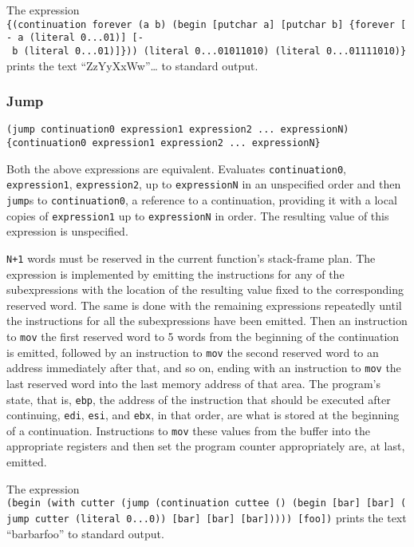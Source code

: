 \documentclass[]{article}
\begin{document}
The expression
\texttt{\{(continuation\ forever\ (a\ b)\ (begin\ {[}putchar\ a{]}\ {[}putchar\ b{]}\ \{forever\ {[}-\ a\ (literal\ 0...01){]}\ {[}-\ b\ (literal\ 0...01){]}\}))\ (literal\ 0...01011010)\ (literal\ 0...01111010)\}}
prints the text ``ZzYyXxWw''\ldots{} to standard output.

\hypertarget{jump}{\subsubsection{Jump}\label{jump}}

\begin{verbatim}
(jump continuation0 expression1 expression2 ... expressionN)
{continuation0 expression1 expression2 ... expressionN}
\end{verbatim}

Both the above expressions are equivalent. Evaluates
\texttt{continuation0}, \texttt{expression1}, \texttt{expression2}, up
to \texttt{expressionN} in an unspecified order and then \texttt{jump}s
to \texttt{continuation0}, a reference to a continuation, providing it
with a local copies of \texttt{expression1} up to \texttt{expressionN}
in order. The resulting value of this expression is unspecified.

\texttt{N+1} words must be reserved in the current function's
stack-frame plan. The expression is implemented by emitting the
instructions for any of the subexpressions with the location of the
resulting value fixed to the corresponding reserved word. The same is
done with the remaining expressions repeatedly until the instructions
for all the subexpressions have been emitted. Then an instruction to
\texttt{mov} the first reserved word to 5 words from the beginning of
the continuation is emitted, followed by an instruction to \texttt{mov}
the second reserved word to an address immediately after that, and so
on, ending with an instruction to \texttt{mov} the last reserved word
into the last memory address of that area. The program's state, that is,
\texttt{ebp}, the address of the instruction that should be executed
after continuing, \texttt{edi}, \texttt{esi}, and \texttt{ebx}, in that
order, are what is stored at the beginning of a continuation.
Instructions to \texttt{mov} these values from the buffer into the
appropriate registers and then set the program counter appropriately
are, at last, emitted.

The expression
\texttt{(begin\ (with\ cutter\ (jump\ (continuation\ cuttee\ ()\ (begin\ {[}bar{]}\ {[}bar{]}\ (jump\ cutter\ (literal\ 0...0))\ {[}bar{]}\ {[}bar{]}\ {[}bar{]}))))\ {[}foo{]})}
prints the text ``barbarfoo'' to standard output.
\end{document}
